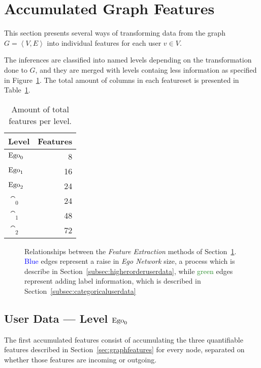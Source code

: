 \section{Accumulated Graph Features}
\label{sec:accumulatedfeatures}

This section presents several ways of transforming data from the graph $G = \left< V, E \right>$ into individual features for each user $v \in V$.

The inferences are classified into named levels depending on the transformation done to $G$, and they are merged with levels containg less information as specified in Figure~\ref{fig:mlrelationships}. The total amount of columns in each featureset is presented in Table~\ref{tab:features}.

\begin{table}
\centering
\begin{tabular}{>{\bfseries}l r}
\toprule
Level & Features \\
\midrule
$\operatorname{Ego}_0$ & \num{8}  \\
$\operatorname{Ego}_1$ & \num{16} \\
$\operatorname{Ego}_2$ & \num{24} \\
$\cat_0$ & \num{24} \\
$\cat_1$ & \num{48} \\
$\cat_2$ & \num{72} \\
\bottomrule
\end{tabular}
\caption{Amount of total features per level.}
\label{tab:features}
\end{table}

\begin{figure}
\centering
\resizebox{!}{.2\textheight}{%
	\framebox{%
		
	}
}
\caption{Relationships between the \emph{Feature Extraction} methods of Section~\ref{sec:accumulatedfeatures}. \textcolor{Blue}{Blue} edges represent a raise in \emph{Ego Network} size, a process which is describe in Section~\ref{subsec:higherorderuserdata}, while \textcolor{ForestGreen}{green} edges represent adding label information, which is described in Section~\ref{subsec:categoricaluserdata}}
\label{fig:mlrelationships}
\end{figure}

\subsection{User Data --- Level $\operatorname{Ego}_0$}
\label{subsec:user_data}

The first accumulated features consist of accumulating the three quantifiable features described in Section~\ref{sec:graphfeatures} for every node, separated on whether those features are incoming or outgoing.

